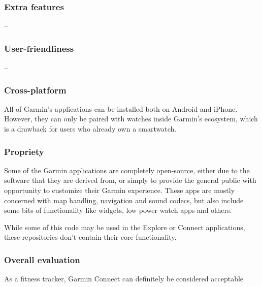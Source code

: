 \subsubsection*{Extra features} -- 
\subsubsection*{User-friendliness} -- 
\subsubsection*{Cross-platform}
All of Garmin's applications can be installed both on Android and iPhone.
However, they can only be paired with watches inside Garmin's ecosystem, which is a drawback for users who already own a smartwatch.
\subsubsection*{Propriety}
Some of the Garmin applications are completely open-source, either due to the software that they are derived from, or simply to provide the general public with opportunity to customize their Garmin experience.\cite{garmin-open-source}\cite{garmin-connect-github-repos}
These apps are mostly concerned with map handling, navigation and sound codecs, but also include some bits of functionality like widgets, low power watch apps and others.

While some of this code may be used in the Explore or Connect applications, these repositories don't contain their core functionality.

\subsubsection*{Overall evaluation}
As a fitness tracker, Garmin Connect can definitely be considered acceptable 
